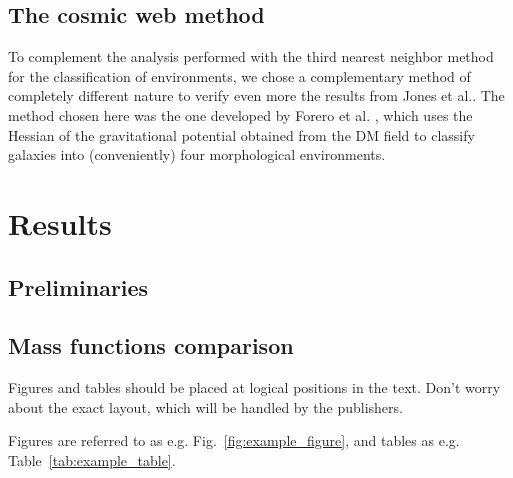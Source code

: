 \documentclass[a4paper,fleqn,usenatbib]{mnras}
\begin{document}
\subsection{The cosmic web method}
To complement the analysis performed with the third nearest neighbor method for the classification of environments, we chose a complementary method of completely different nature to verify even more the results from Jones et al.. The method chosen here was the one developed by Forero et al. \cite{forero1}, which uses the Hessian of the gravitational potential obtained from the DM field to classify galaxies into (conveniently) four morphological environments.\\ 

\section{Results}
\subsection{Preliminaries}

\subsection{Mass functions comparison}

Figures and tables should be placed at logical positions in the text. Don't
worry about the exact layout, which will be handled by the publishers.

Figures are referred to as e.g. Fig.~\ref{fig:example_figure}, and tables as
e.g. Table~\ref{tab:example_table}.
\end{document}
